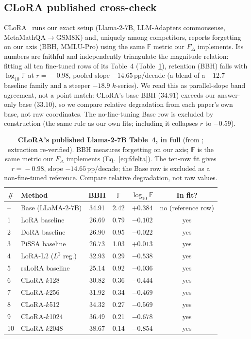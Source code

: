 \documentclass[11pt]{article}
\newcommand{\dw}{F_{\Delta}}
\begin{document}
\subsection{CLoRA published cross-check}\label{app:clora}
CLoRA~\citep{clora} runs our exact setup (Llama-2-7B, LLM-Adapters commonsense,
MetaMathQA$\rightarrow$GSM8K) and, uniquely among competitors, reports forgetting
on our axis (BBH, MMLU-Pro) using the same $\mathbb{F}$ metric our $\dw$
implements. Its numbers are faithful and independently triangulate the magnitude
relation: fitting all ten fine-tuned rows of its Table~4
(Table~\ref{tab:clora}), retention (BBH) falls with $\log_{10}\mathbb{F}$ at
$r\!=\!-0.98$, pooled slope $-14.65$\,pp/decade (a blend of a $-12.7$ baseline
family and a steeper $-18.9$ $k$-series). We read this as parallel-slope
band agreement, not a point match: CLoRA's base BBH ($34.91$) exceeds our
answer-only base ($33.10$), so we compare relative degradation from each paper's
own base, not raw coordinates. The no-fine-tuning Base row is excluded by
construction (the same rule as our own fits; including it collapses $r$ to
$-0.59$).

\begin{table}[t]
  \centering
  \begin{tabular}{llcccc}
    \toprule
    \# & Method & BBH & $\mathbb{F}$ & $\log_{10}\mathbb{F}$ & In fit? \\
    \midrule
    -- & Base (LLaMA-2-7B) & 34.91 & 2.42 & $+0.384$ & no (reference row) \\
    \midrule
    1  & LoRA baseline     & 26.69 & 0.79 & $-0.102$ & yes \\
    2  & DoRA baseline     & 26.90 & 0.95 & $-0.022$ & yes \\
    3  & PiSSA baseline    & 26.73 & 1.03 & $+0.013$ & yes \\
    4  & LoRA-L2 ($L^2$ reg.) & 32.93 & 0.29 & $-0.538$ & yes \\
    5  & rsLoRA baseline   & 25.14 & 0.92 & $-0.036$ & yes \\
    6  & CLoRA-$k$128      & 30.82 & 0.36 & $-0.444$ & yes \\
    7  & CLoRA-$k$256      & 31.92 & 0.34 & $-0.469$ & yes \\
    8  & CLoRA-$k$512      & 34.32 & 0.27 & $-0.569$ & yes \\
    9  & CLoRA-$k$1024     & 36.49 & 0.21 & $-0.678$ & yes \\
    10 & CLoRA-$k$2048     & 38.67 & 0.14 & $-0.854$ & yes \\
    \bottomrule
  \end{tabular}
  \caption{\textbf{CLoRA's published Llama-2-7B Table~4, in full} (from
  \citealp{clora}; extraction re-verified). BBH measures forgetting on our axis;
  $\mathbb{F}$ is the same metric our $\dw$ implements (Eq.~\ref{eq:fdelta}). The
  ten-row fit gives $r\!=\!-0.98$, slope $-14.65$\,pp/decade; the Base row is
  excluded as a non-fine-tuned reference. Compare relative degradation, not raw
  values.}
  \label{tab:clora}
\end{table}
\end{document}
